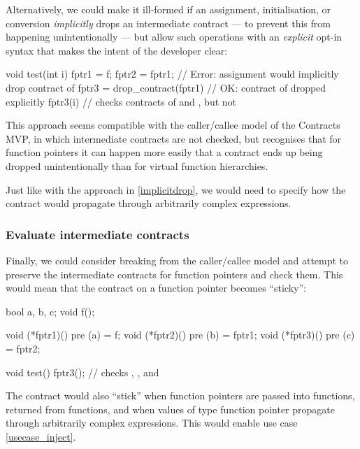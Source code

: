 Alternatively, we could make it ill-formed if an assignment, initialisation, or conversion \emph{implicitly} drops an intermediate contract --- to prevent this from happening unintentionally --- but allow such operations with an \emph{explicit} opt-in syntax that makes the intent of the developer clear:
\begin{codeblock}
void test(int i) {
  fptr1 = f;
  fptr2 = fptr1;                // Error: assignment would implicitly drop contract of 
  fptr3 = drop_contract(fptr1)  // OK: contract of  dropped explicitly
  fptr3(i)                      // checks contracts of  and , but not 
}
\end{codeblock}
This approach seems compatible with the caller/callee model of the Contracts MVP, in which intermediate contracts are not checked, but recognises that for function pointers it can happen more easily that a contract ends up being dropped unintentionally than for virtual function hierarchies.

Just like with the approach in \ref{implicitdrop}, we would need to specify how the contract would propagate through arbitrarily complex expressions. 


\subsubsection{Evaluate intermediate contracts}
\label{sticky}

Finally, we could consider breaking from the caller/callee model and attempt to preserve the intermediate contracts for function pointers and check them. This would mean that the contract on a function pointer becomes ``sticky'':
\begin{codeblock}
bool a, b, c;
void f();

void (*fptr1)() pre (a) = f;
void (*fptr2)() pre (b) = fptr1;
void (*fptr3)() pre (c) = fptr2;

void test() {
  fptr3();  // checks , , and 
}
\end{codeblock}
The contract would also ``stick'' when function pointers are passed into functions, returned from functions, and when values of type function pointer propagate through arbitrarily complex expressions. This would enable use case \ref{usecase_inject}.

